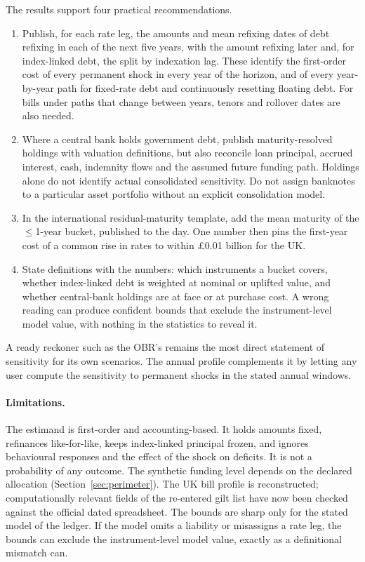 \documentclass[11pt,a4paper]{article}
\theoremstyle{remark}
\begin{document}
The results support four practical recommendations.
\begin{enumerate}
\item Publish, for each rate leg, the amounts and mean refixing dates of debt refixing in each of the next five years, with the amount refixing later and, for index-linked debt, the split by indexation lag. These identify the first-order cost of every permanent shock in every year of the horizon, and of every year-by-year path for fixed-rate debt and continuously resetting floating debt. For bills under paths that change between years, tenors and rollover dates are also needed.
\item Where a central bank holds government debt, publish maturity-resolved holdings with valuation definitions, but also reconcile loan principal, accrued interest, cash, indemnity flows and the assumed future funding path. Holdings alone do not identify actual consolidated sensitivity. Do not assign banknotes to a particular asset portfolio without an explicit consolidation model.
\item In the international residual-maturity template, add the mean maturity of the $\le$1-year bucket, published to the day. One number then pins the first-year cost of a common rise in rates to within £0.01 billion for the UK.
\item State definitions with the numbers: which instruments a bucket covers, whether index-linked debt is weighted at nominal or uplifted value, and whether central-bank holdings are at face or at purchase cost. A wrong reading can produce confident bounds that exclude the instrument-level model value, with nothing in the statistics to reveal it.
\end{enumerate}
A ready reckoner such as the OBR's remains the most direct statement of sensitivity for its own scenarios. The annual profile complements it by letting any user compute the sensitivity to permanent shocks in the stated annual windows.

\paragraph{Limitations.} The estimand is first-order and accounting-based. It holds amounts fixed, refinances like-for-like, keeps index-linked principal frozen, and ignores behavioural responses and the effect of the shock on deficits. It is not a probability of any outcome. The synthetic funding level depends on the declared allocation (Section~\ref{sec:perimeter}). The UK bill profile is reconstructed; computationally relevant fields of the re-entered gilt list have now been checked against the official dated spreadsheet. The bounds are sharp only for the stated model of the ledger. If the model omits a liability or misassigns a rate leg, the bounds can exclude the instrument-level model value, exactly as a definitional mismatch can.
\end{document}
